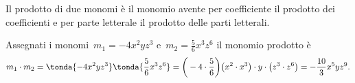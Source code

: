 \begin{definizione}
 Il prodotto di due monomi è il monomio avente
per coefficiente il prodotto dei coefficienti e per parte letterale il
prodotto delle parti letterali.
\end{definizione}

 \begin{esempio}
Assegnati i monomi~\(m_{1}=-4x^{2}yz^{3}\) e~\(m_{2}=\frac{5}{6}x^{3}z^{6}\)
il monomio prodotto è
\[m_{1} \cdot m_{2}=\tonda{-4x^{2}yz^{3}} \tonda{\frac{5}{6}x^{3}z^{6}}=
\bigg(-4\cdot {\frac{5}{6}}\bigg)\big(x^{2}\cdot x^{3}\big)\cdot 
y\cdot \big(z^{3}\cdot z^{6}\big)=-\frac{10}{3}x^{5}yz^{9}.\]
 \end{esempio}


% 

% 


